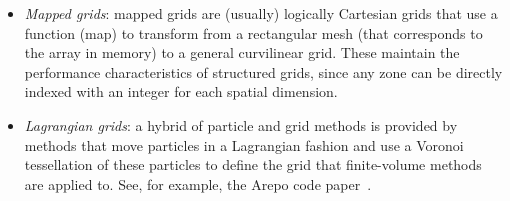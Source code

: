 \begin{itemize}
\item {\em Mapped grids}: mapped grids are (usually) logically
  Cartesian grids that use a function (map) to transform from
  a rectangular mesh (that corresponds to the array in memory)
  to a general curvilinear grid.  These maintain the performance
  characteristics of structured grids, since any zone can be
  directly indexed with an integer for each spatial dimension. 

\item {\em Lagrangian grids}: a hybrid of particle and grid methods is
  provided by methods that move particles in a Lagrangian fashion and
  use a Voronoi tessellation of these particles to define the grid
  that finite-volume methods are applied to.  See, for example,
  the Arepo code paper~\cite{arepo}.
\end{itemize}
